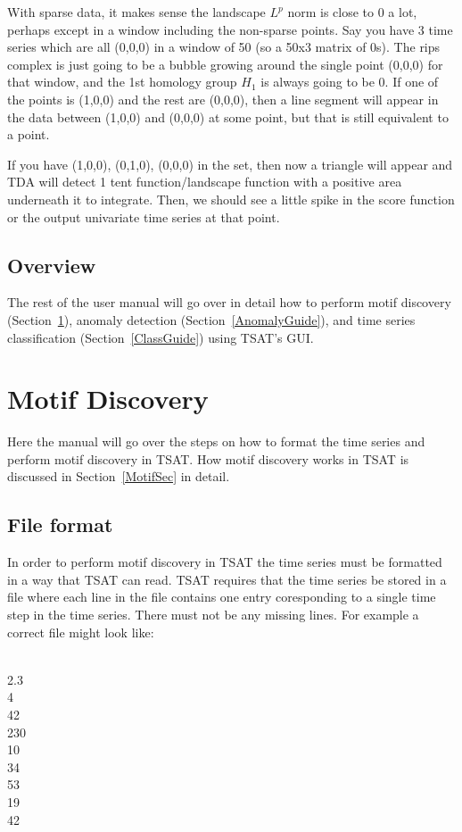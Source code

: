 \documentclass[titlepage, letterpaper, 12pt]{article}
\newenvironment{allintypewriter}{\ttfamily}{\par}
\begin{document}
With sparse data, it makes sense the landscape \(L^p\) norm is close to 0 a lot, perhaps except in a window including the non-sparse points.  Say you have 3 time series which are all (0,0,0) in a window of 50 (so a 
50x3 matrix of 0s).  The rips complex is just going to be a bubble growing around the single point (0,0,0) for that window, and the 1st homology group \(H_1\) is always going to be 0.  If one of the points is (1,0,0) and the rest are (0,0,0), then a line segment will appear in the data between (1,0,0) and (0,0,0) at some point, but that is still equivalent to a point.

If you have (1,0,0), (0,1,0), (0,0,0) in the set, then now a triangle will appear and TDA will detect 1 tent function/landscape function with a positive area underneath it to integrate.  Then, we should see a little spike in the score function or the output univariate time series at that point.

\subsection{Overview}

The rest of the user manual will go over in detail how to perform motif discovery (Section~\ref{MotifGuide}), anomaly detection (Section~\ref{AnomalyGuide}), and time series classification (Section~\ref{ClassGuide}) using TSAT's GUI.

\section{Motif Discovery}
\label{MotifGuide}

Here the manual will go over the steps on how to format the time series and perform motif discovery in TSAT.  How motif discovery works in TSAT is discussed in Section~\ref{MotifSec} in detail.

\subsection{File format}

In order to perform motif discovery in TSAT the time series must be formatted in a way that TSAT can read.  TSAT requires that the time series be stored in a file where each line in the file contains one entry coresponding to a single time step in the time series.  There must not be any missing lines.  For example a correct file might look like:

\begin{allintypewriter}
	\\
	2.3\\
	4\\
	42\\
	230\\
	10\\
	34\\
	53\\
	19\\
	42\\
\end{allintypewriter}
\end{document}
